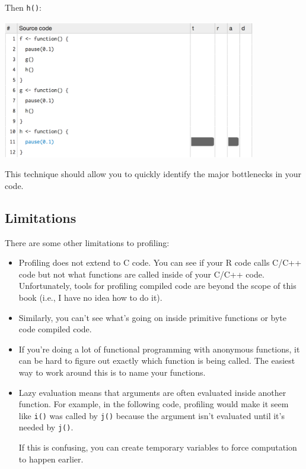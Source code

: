 Then \texttt{h()}:

\includegraphics[width=4.35in]{screenshots/profiling-lineprof-h.png}

This technique should allow you to quickly identify the major
bottlenecks in your code.

\subsection{Limitations}

There are some other limitations to profiling:

\begin{itemize}
\item
  Profiling does not extend to C code. You can see if your R code calls
  C/C++ code but not what functions are called inside of your C/C++
  code. Unfortunately, tools for profiling compiled code are beyond the
  scope of this book (i.e., I have no idea how to do it).
\item
  Similarly, you can't see what's going on inside primitive functions or
  byte code compiled code.
\item
  If you're doing a lot of functional programming with anonymous
  functions, it can be hard to figure out exactly which function is
  being called. The easiest way to work around this is to name your
  functions.
\item
  Lazy evaluation means that arguments are often evaluated inside
  another function. For example, in the following code, profiling would
  make it seem like \texttt{i()} was called by \texttt{j()} because the
  argument isn't evaluated until it's needed by \texttt{j()}.

\begin{Shaded}
\begin{Highlighting}[]
\StringTok{ }
  \NormalTok{(}\NormalTok{)}
\NormalTok{\}}
\StringTok{ }
  \StringTok{ }
\NormalTok{\}}
\NormalTok{(}\NormalTok{())}
\end{Highlighting}
\end{Shaded}

  If this is confusing, you can create temporary variables to force
  computation to happen earlier.
\end{itemize}

